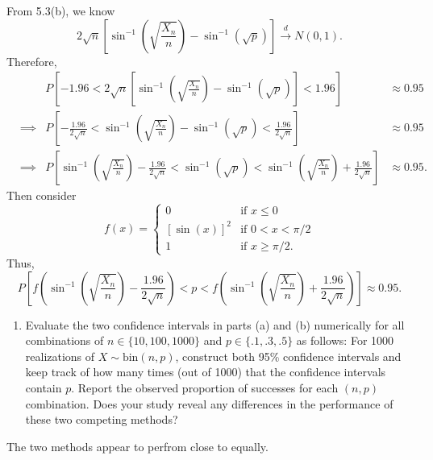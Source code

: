 \documentclass[12pt,]{article}
\providecommand{\tightlist}{%
  \setlength{\itemsep}{0pt}\setlength{\parskip}{0pt}}
\begin{document}
From 5.3(b), we know
\[2\sqrt{n}\left[\sin^{-1}\left(\sqrt{\frac{X_n}{n}}\right)-\sin^{-1}(\sqrt{p})\right]\overset{d}\rightarrow N(0,1).\]
Therefore, \begin{align*}
&&P\left[-1.96 <2\sqrt{n}\left[\sin^{-1}\left(\sqrt{\frac{X_n}{n}}\right)-\sin^{-1}(\sqrt{p})\right]< 1.96\right] & \approx 0.95\\
&\implies&P\left[-\frac{1.96}{2\sqrt{n}} <\sin^{-1}\left(\sqrt{\frac{X_n}{n}}\right)-\sin^{-1}(\sqrt{p})< \frac{1.96}{2\sqrt{n}}\right] & \approx 0.95\\
&\implies&P\left[\sin^{-1}\left(\sqrt{\frac{X_n}{n}}\right)-\frac{1.96}{2\sqrt{n}} <\sin^{-1}(\sqrt{p})<\sin^{-1}\left(\sqrt{\frac{X_n}{n}}\right)+ \frac{1.96}{2\sqrt{n}}\right] & \approx 0.95.
\end{align*} Then consider \[f(x) = \begin{cases}
                                   0 & \text{if } x\le 0 \\
                                   [\sin(x)]^2 & \text{if } 0<x<\pi/2\\
                                   1 & \text{if } x \ge \pi/2.
        \end{cases}\] Thus,
\[P\left[f\left(\sin^{-1}\left(\sqrt{\frac{X_n}{n}}\right)-\frac{1.96}{2\sqrt{n}} \right)<p<f\left(\sin^{-1}\left(\sqrt{\frac{X_n}{n}}\right)+ \frac{1.96}{2\sqrt{n}}\right)\right] \approx 0.95.\]

\begin{enumerate}
\def\labelenumi{(\alph{enumi})}
\setcounter{enumi}{2}
\tightlist
\item
  Evaluate the two confidence intervals in parts (a) and (b) numerically
  for all combinations of \(n \in \{10,100,1000\}\) and
  \(p\in \{.1,.3,.5\}\) as follows: For 1000 realizations of
  \(X\sim \text{bin}(n,p)\), construct both 95\% confidence intervals
  and keep track of how many times (out of 1000) that the confidence
  intervals contain \(p\). Report the observed proportion of successes
  for each \((n,p)\) combination. Does your study reveal any differences
  in the performance of these two competing methods?
\end{enumerate}

The two methods appear to perfrom close to equally.
\end{document}
